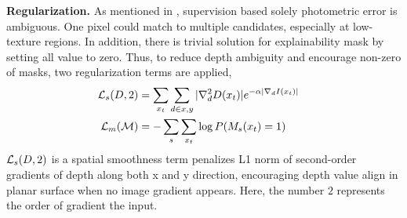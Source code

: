 

\textbf{Regularization.} 
As mentioned in , supervision based solely photometric error is ambiguous. One pixel could match to multiple candidates, especially at low-texture regions. In addition, there is trivial solution for explainability mask by setting all value to zero. Thus, to reduce depth ambiguity and encourage non-zero of masks, two regularization terms are applied, 
\begin{align}
\label{eqn:regular}
{\mathcal L}_{s}(D, 2) &= \sum_{x_t}\sum_{d \in {x, y}}|\nabla^{2}_dD(x_t)|e^{-\alpha|\nabla_dI(x_t)|} & \nonumber \\
{\mathcal L}_{m}({\mathcal M}) &= -\sum_s\sum_{x_t}\log P(M_s(x_t) = 1) &
\end{align}
${\mathcal L}_{s}(D, 2)$ is a spatial smoothness term penalizes L1 norm of second-order gradients of depth along both x and y direction, encouraging depth value align in planar surface when no image gradient appears. Here, the number $2$ represents the order of gradient \wrt the input.

